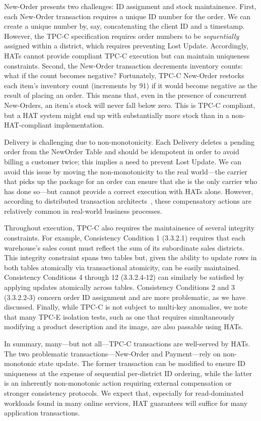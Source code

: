 New-Order presents two challenges: ID assignment and stock
maintainence. First, each New-Order transaction requires a unique ID
number for the order. We can create a unique number by, say,
concatenating the client ID and a timestamp. However, the TPC-C
specification requires order numbers to be \textit{sequentially}
assigned within a district, which requires preventing Lost
Update. Accordingly, HATs cannot provide compliant TPC-C execution but
can maintain uniqueness constraints. Second, the New-Order transaction
decrements inventory counts: what if the count becomes negative?
Fortunately, TPC-C New-Order restocks each item's inventory count
(increments by 91) if it would become negative as the result of
placing an order. This means that, even in the presence of concurrent
New-Orders, an item's stock will never fall below zero. This is TPC-C
compliant, but a HAT system might end up with substantially more stock
than in a non-HAT-compliant implementation.

Delivery is challenging due to non-monotonicity. Each Delivery deletes
a pending order from the NewOrder Table and should be idempotent in
order to avoid billing a customer twice; this implies a need to
prevent Lost Update. We can avoid this issue by moving the
non-monotonicity to the real world---the carrier that picks up the
package for an order can ensure that she is the only carrier who has
done so---but cannot provide a correct execution with HATs
alone. However, according to distributed transaction
architects~\cite{entitygroup}, these compensatory actions are
relatively common in real-world business processes.

Throughout execution, TPC-C also requires the maintainence of several
integrity constraints. For example, Consistency Condition 1 (3.3.2.1)
requires that each warehouse's sales count must reflect the sum of its
subordinate sales districts. This integrity constraint spans two
tables but, given the ability to update rows in both tables atomically
via transactional atomicity, can be easily maintained. Consistency
Conditions 4 through 12 (3.3.2.4-12) can similarly be satisfied by
applying updates atomically across tables. Consistency Conditions 2
and 3 (3.3.2.2-3) concern order ID assignment and are more
problematic, as we have discussed.  Finally, while TPC-C is not
subject to multi-key anomalies, we note that many TPC-E isolation
tests, such as one that requires simultaneously modifying a product
description and its image, are also passable using HATs.

In summary, many---but not all---TPC-C transactions are well-served by
HATs. The two problematic transactions---New-Order and Payment---rely
on non-monotonic state update. The former transaction can be modified
to ensure ID uniqueness at the expense of sequential per-district ID
ordering, while the latter is an inherently non-monotonic action
requiring external compensation or stronger consistency protocols. We
expect that, especially for read-dominated workloads found in many
online services, HAT guarantees will suffice for many application
transactions.

